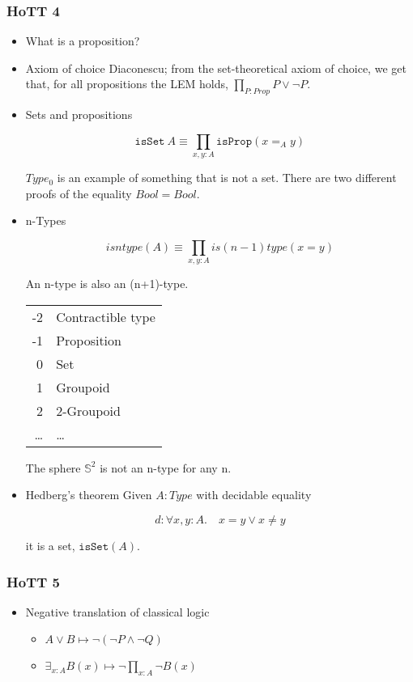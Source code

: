 \documentclass[11pt]{article}
\begin{document}
\subsubsection*{HoTT 4}
\label{sec-9-3-4}
\begin{itemize}
\item What is a proposition?
\label{sec-9-3-4-1}
\item Axiom of choice
\label{sec-9-3-4-2}
Diaconescu; from the set-theoretical axiom of choice, we get that,
for all propositions the LEM holds, $\prod_{P:Prop} P \vee \neg P$.
\item Sets and propositions
\label{sec-9-3-4-3}

\[ \mathtt{isSet}\ A \equiv
\prod_{x,y:A} \mathtt{isProp}(x =_{A} y)
\]

$Type_0$ is an example of something that is not a set. There are two
different proofs of the equality $Bool = Bool$.

\item n-Types
\label{sec-9-3-4-4}

\[
isntype(A) \equiv
\prod_{x,y:A} is(n-1)type(x = y)
\]

An n-type is also an (n+1)-type.

\begin{center}
\begin{tabular}{rl}
-2 & Contractible type\\
-1 & Proposition\\
0 & Set\\
1 & Groupoid\\
2 & 2-Groupoid\\
\ldots{} & \ldots{}\\
\end{tabular}
\end{center}

The sphere $\mathbb{S}^2$ is not an n-type for any n.

\item Hedberg's theorem
\label{sec-9-3-4-5}
Given $A:Type$ with decidable equality

\[
d : \forall x,y : A.\quad x=y \vee x \neq y
\]

it is a set, $\mathtt{isSet}(A)$.
\end{itemize}
\subsubsection*{HoTT 5}
\label{sec-9-3-5}
\begin{itemize}
\item Negative translation of classical logic
\label{sec-9-3-5-1}

\begin{itemize}
\item $A \vee B \mapsto \neg (\neg P \wedge \neg Q)$
\item $\exists_{x:A}B(x) \mapsto \neg \prod_{x:A} \neg B(x)$
\end{itemize}
\end{itemize}
\end{document}
